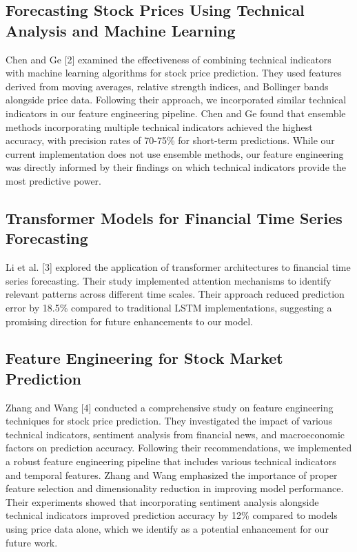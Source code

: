 \documentclass[sigconf]{acmart}
\begin{document}
\subsection{Forecasting Stock Prices Using Technical Analysis and Machine Learning}

Chen and Ge [2] examined the effectiveness of combining technical indicators with machine learning algorithms for stock price prediction. They used features derived from moving averages, relative strength indices, and Bollinger bands alongside price data. Following their approach, we incorporated similar technical indicators in our feature engineering pipeline. Chen and Ge found that ensemble methods incorporating multiple technical indicators achieved the highest accuracy, with precision rates of 70-75\% for short-term predictions. While our current implementation does not use ensemble methods, our feature engineering was directly informed by their findings on which technical indicators provide the most predictive power.

\subsection{Transformer Models for Financial Time Series Forecasting}

Li et al. [3] explored the application of transformer architectures to financial time series forecasting. Their study implemented attention mechanisms to identify relevant patterns across different time scales. Their approach reduced prediction error by 18.5\% compared to traditional LSTM implementations, suggesting a promising direction for future enhancements to our model.

\subsection{Feature Engineering for Stock Market Prediction}

Zhang and Wang [4] conducted a comprehensive study on feature engineering techniques for stock price prediction. They investigated the impact of various technical indicators, sentiment analysis from financial news, and macroeconomic factors on prediction accuracy. Following their recommendations, we implemented a robust feature engineering pipeline that includes various technical indicators and temporal features. Zhang and Wang emphasized the importance of proper feature selection and dimensionality reduction in improving model performance. Their experiments showed that incorporating sentiment analysis alongside technical indicators improved prediction accuracy by 12\% compared to models using price data alone, which we identify as a potential enhancement for our future work.
\end{document}
